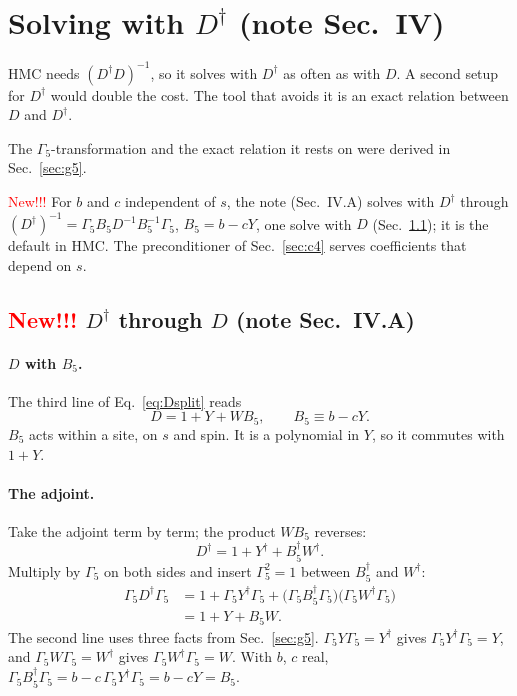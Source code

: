 \documentclass[11pt,a4paper]{article}
\numberwithin{equation}{section}
\newcommand{\dg}{^{\dagger}}
\newcommand{\Gfive}{\Gamma_5}
\begin{document}
\section{Solving with $D\dg$ (note Sec.~IV)}
\label{sec:dagger}
HMC needs $(D\dg D)^{-1}$, so it solves with $D\dg$ as often as with $D$. A second setup for $D\dg$
would double the cost. The tool that avoids it is an exact relation between $D$ and $D\dg$.

The $\Gfive$-transformation and the exact relation it rests on were derived in Sec.~\ref{sec:g5}.

\textcolor{red}{New!!!} For $b$ and $c$ independent of $s$, the note (Sec.~IV.A) solves with $D\dg$ through
$(D\dg)^{-1}=\Gfive B_5D^{-1}B_5^{-1}\Gfive$, $B_5=b-cY$, one solve with $D$ (Sec.~\ref{sec:b5}); it is the
default in HMC. The preconditioner of Sec.~\ref{sec:c4} serves coefficients that depend on $s$.

\subsection{\textcolor{red}{New!!!} $D\dg$ through $D$ (note Sec.~IV.A)}
\label{sec:b5}
\paragraph{$D$ with $B_5$.} The third line of Eq.~\eqref{eq:Dsplit} reads
\begin{equation}
D=1+Y+W B_5,\qquad B_5\equiv b-cY .
\end{equation}
$B_5$ acts within a site, on $s$ and spin. It is a polynomial in $Y$, so it commutes with $1+Y$.

\paragraph{The adjoint.} Take the adjoint term by term; the product $WB_5$ reverses:
\begin{equation}
D\dg=1+Y\dg+B_5\dg W\dg .
\end{equation}
Multiply by $\Gfive$ on both sides and insert $\Gfive^2=1$ between $B_5\dg$ and $W\dg$:
\begin{align}
\Gfive D\dg\Gfive&=1+\Gfive Y\dg\Gfive+\big(\Gfive B_5\dg\Gfive\big)\big(\Gfive W\dg\Gfive\big)\nonumber\\
&=1+Y+B_5W .
\end{align}
The second line uses three facts from Sec.~\ref{sec:g5}. $\Gfive Y\Gfive=Y\dg$ gives
$\Gfive Y\dg\Gfive=Y$, and $\Gfive W\Gfive=W\dg$ gives $\Gfive W\dg\Gfive=W$. With $b$, $c$ real,
$\Gfive B_5\dg\Gfive=b-c\,\Gfive Y\dg\Gfive=b-cY=B_5$.
\end{document}

